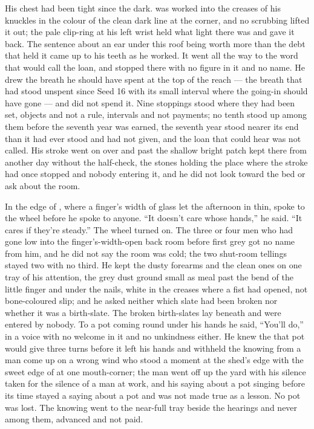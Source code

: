 His chest had been tight since the dark.  was worked into the creases of his knuckles in the colour of the clean dark line at the corner, and no scrubbing lifted it out; the pale clip-ring at his left wrist held what light there was and gave it back. The sentence about an ear under this roof being worth more than the debt that held it came up to his teeth as he worked. It went all the way to the word that would call the loan, and stopped there with no figure in it and no name. He drew the breath he should have spent at the top of the reach --- the breath that had stood unspent since Seed 16 with its small interval where the going-in should have gone --- and did not spend it. Nine stoppings stood where they had been set, objects and not a rule, intervals and not payments; no tenth stood up among them before the seventh year was earned, the seventh year stood nearer its end than it had ever stood and had not given, and the loan that could hear was not called. His stroke went on over  and past the shallow bright patch kept there from another day without the half-check, the stones holding the place where the stroke had once stopped and nobody entering it, and he did not look toward the bed or ask about the room.

In the edge of , where a finger's width of glass let the afternoon in thin,  spoke to the wheel before he spoke to anyone. “It doesn't care whose hands,” he said. “It cares if they're steady.” The wheel turned on. The three or four men who had gone low into the finger's-width-open back room before first grey got no name from him, and he did not say the room was cold; the two shut-room tellings stayed two with no third. He kept the dusty forearms and the clean ones on one tray of his attention, the grey  dust ground small as meal past the bend of the little finger and under the nails, white in the creases where a fist had opened, not bone-coloured slip; and he asked neither which slate had been broken nor whether it was a birth-slate. The broken birth-slates lay beneath  and were entered by nobody. To a pot coming round under his hands he said, “You'll do,” in a voice with no welcome in it and no unkindness either. He knew the  that pot would give three turns before it left his hands and withheld the knowing from a man come up on a wrong wind who stood a moment at the shed's edge with the sweet edge of  at one mouth-corner; the man went off up the yard with his silence taken for the silence of a man at work, and his saying about a pot singing before its time stayed a saying about a pot and was not made true as a lesson. No pot was lost. The knowing went to the near-full tray beside the hearings and never among them, advanced and not paid.

